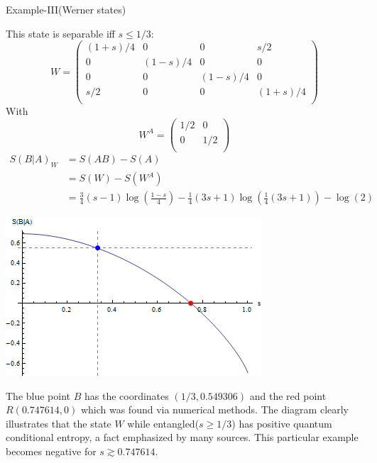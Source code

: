 \documentclass{beamer}
\begin{document}
\begin{frame}{Example-III(Werner states)}
\begin{scriptsize}
This state is separable iff $s \leq 1/3$:
\begin{equation*}
W=\left( \begin{array}{cccc}
 (1+s)/4 & 0 & 0 & s/2 \\
 0 & (1-s)/4 & 0 & 0 \\
 0 & 0 & (1-s)/4 & 0 \\
 s/2 & 0 & 0 & (1+s)/4 \\
\end{array}
\right)
\end{equation*}
With
\begin{equation*}
W^A=
\left( \begin{array}{cccc}
 1/2 & 0  \\
 0 & 1/2 \\
\end{array}
\right)
\end{equation*}
\begin{align*}
S(B|A)_{W}&=S(AB)-S(A)
\nonumber \\[0.5em] &= S(W)-S(W^A)
\nonumber \\[0.5em] &= 
\frac{3}{4} (s-1) \log \left(\frac{1-s}{4}\right)-\frac{1}{4} (3 s+1) \log \left(\frac{1}{4} (3 s+1)\right)-\log (2)
\end{align*}
\end{scriptsize}
\end{frame}

\begin{frame}
\begin{center}
\includegraphics[scale=0.6]{figures/conditional_vonNeumann_Werner.png}\label{fig2}
\end{center}
\begin{scriptsize}
The blue point $B$ has the coordinates $(1/3,0.549306)$ and the red point $R(0.747614,0)$ which was found via numerical methods. The diagram clearly illustrates that the state $W$ while entangled($s\geq 1/3 $) has positive quantum conditional entropy, a fact emphasized by many sources. This particular example becomes negative for $s  \gtrsim 0.747614$.
\end{scriptsize}
\end{frame}
\end{document}

